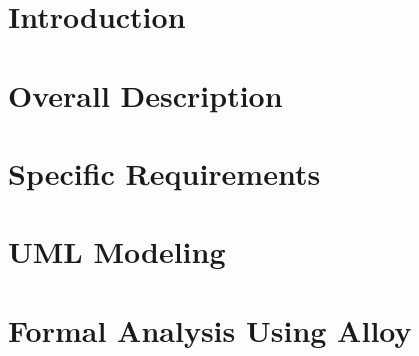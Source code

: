 \setcounter{page}{2}


\newpage
\tableofcontents
\newpage
{}
{}
\listoffigures
{}
{}
\listoftables

\clearpage
\section{Introduction}
\label{sect:introduction}


\clearpage
\section{Overall Description}
\label{sect:overview}


\clearpage
\section{Specific Requirements}
\label{sect:requirements}


\clearpage
\section{UML Modeling}
\label{sect:uml}


\clearpage
\section{Formal Analysis Using Alloy}
\label{sect:alloy}


